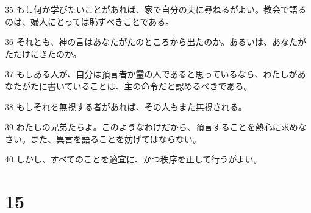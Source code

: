 \par 35 もし何か学びたいことがあれば、家で自分の夫に尋ねるがよい。教会で語るのは、婦人にとっては恥ずべきことである。
\par 36 それとも、神の言はあなたがたのところから出たのか。あるいは、あなたがただけにきたのか。
\par 37 もしある人が、自分は預言者か霊の人であると思っているなら、わたしがあなたがたに書いていることは、主の命令だと認めるべきである。
\par 38 もしそれを無視する者があれば、その人もまた無視される。
\par 39 わたしの兄弟たちよ。このようなわけだから、預言することを熱心に求めなさい。また、異言を語ることを妨げてはならない。
\par 40 しかし、すべてのことを適宜に、かつ秩序を正して行うがよい。

\chapter{15}

